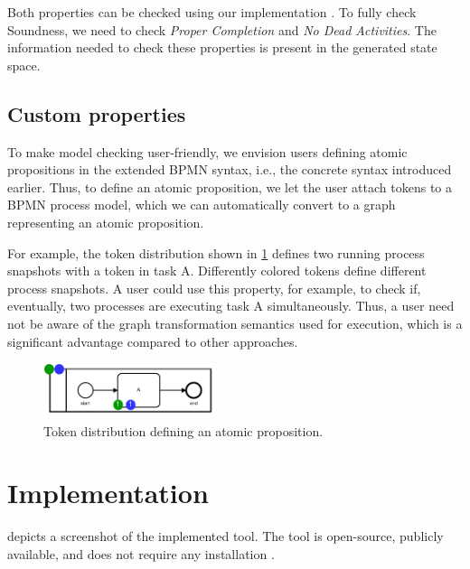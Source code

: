 \documentclass[submission, copyright, creativecommons]{eptcs}
\begin{document}
Both properties can be checked using our implementation \cite{timkrauterArtifactsTERMGRAPH2022}.
To fully check Soundness, we need to check \textit{Proper Completion} and \textit{No Dead Activities}.
The information needed to check these properties is present in the generated state space.

\subsection{Custom properties} \label{subsec:customProperties}
To make model checking user-friendly, we envision users defining atomic propositions in the extended BPMN syntax, i.e., the concrete syntax introduced earlier.
Thus, to define an atomic proposition, we let the user attach tokens to a BPMN process model, which we can automatically convert to a graph representing an atomic proposition.

For example, the token distribution shown in \cref{fig:atomicProposition} defines two running process snapshots with a token in task A.
Differently colored tokens define different process snapshots.
A user could use this property, for example, to check if, eventually, two processes are executing task A simultaneously.
Thus, a user need not be aware of the graph transformation semantics used for execution, which is a significant advantage compared to other approaches.

\begin{figure}[h]
    \centering
    \includegraphics[width=0.45\textwidth]{images/bpmn_semantics-atomic-proposition.pdf}
    \caption{Token distribution defining an atomic proposition.}
    \label{fig:atomicProposition}
\end{figure}

\section{Implementation} \label{sec:impl}
 depicts a screenshot of the implemented tool.
The tool is open-source, publicly available, and does not require any installation \cite{timkrauterArtifactsTERMGRAPH2022}.
\end{document}
